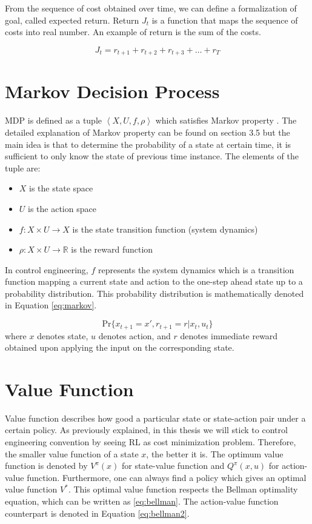 From the sequence of cost obtained over time, we can define a formalization of goal, called expected return. Return $J_t$ is a function that maps the sequence of costs into real number. An example of return is the sum of the costs.

\begin{equation}
J_t = r_{t+1} + r_{t+2} + r_{t+3} + \dots + r_T
\end{equation} 

\section{Markov Decision Process} \label{sec:mdp}
\ac{MDP} is defined as a tuple $\left<X, U, f, \rho \right>$ which satisfies Markov property \cite{babuskaRL}. The detailed explanation of Markov property can be found on \cite{sutton1998reinforcement} section 3.5 but the main idea is that to determine the probability of a state at certain time, it is sufficient to only know the state of previous time instance. The elements of the tuple are:
\begin{itemize}
	\item $X$ is the state space
	\item $U$ is the action space
	\item $f :X \times U \rightarrow X$ is the state transition function (system dynamics) 
	\item $\rho:X \times U \rightarrow \mathbb{R}$ is the reward function
\end{itemize}

In control engineering, $f$ represents the system dynamics which is a transition function mapping a current state and action to the one-step ahead state up to a probability distribution. This probability distribution is mathematically denoted in Equation \eqref{eq:markov}.

\begin{equation}
	\text{Pr}\{x_{t+1} = x', r_{t+1} = r| x_t, u_t \}
	\label{eq:markov}
\end{equation}
where $x$ denotes state, $u$ denotes action, and $r$ denotes immediate reward obtained upon applying the input on the corresponding state. 



\section{Value Function} \label{sec:value}
Value function describes how good a particular state or state-action pair under a certain policy. As previously explained, in this thesis we will stick to control engineering convention by seeing \ac{RL} as cost minimization problem. Therefore, the smaller value function of a state $x$, the better it is. The optimum value function is denoted by $ V^{\pi}(x) $ for state-value function and $ Q^{\pi}(x,u) $ for action-value function. Furthermore, one can always find a policy which gives an optimal value function $V^*$. This optimal value function respects the Bellman optimality equation, which can be written as \ref{eq:bellman}. The action-value function counterpart is denoted in Equation \ref{eq:bellman2}. 

